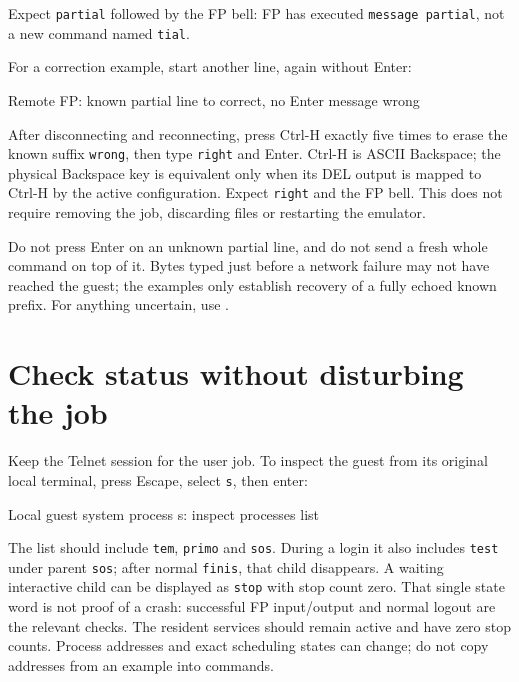 Expect \texttt{partial} followed by the FP bell: FP has executed
\texttt{message partial}, not a new command named \texttt{tial}.

For a correction example, start another line, again without Enter:

\begin{commandexample}{Remote FP: known partial line to correct, no Enter}
message wrong
\end{commandexample}

After disconnecting and reconnecting, press Ctrl-H exactly five times to
erase the known suffix \texttt{wrong}, then type \texttt{right} and Enter.
Ctrl-H is ASCII Backspace; the physical Backspace key is equivalent only
when its DEL output is mapped to Ctrl-H by the active configuration.
Expect \texttt{right} and the FP bell. This does not require removing the
job, discarding files or restarting the emulator.

Do not press Enter on an unknown partial line, and do not send a fresh whole
command on top of it. Bytes typed just before a network failure may not have
reached the guest; the examples only establish recovery of a fully echoed
known prefix. For anything uncertain, use
.

\section{Check status without disturbing the job}\label{mips-ts-status}

Keep the Telnet session for the user job. To inspect the guest from its
original local terminal, press Escape, select \texttt{s}, then enter:

\begin{commandexample}{Local guest system process s: inspect processes}
list
\end{commandexample}

The list should include \texttt{tem}, \texttt{primo} and \texttt{sos}.
During a login it also includes \texttt{test} under parent \texttt{sos};
after normal \texttt{finis}, that child disappears. A waiting interactive
child can be displayed as \texttt{stop} with stop count zero. That single
state word is not proof of a crash: successful FP input/output and normal
logout are the relevant checks. The resident services should remain active
and have zero stop counts. Process addresses and exact scheduling states
can change; do not copy addresses from an example into commands.

